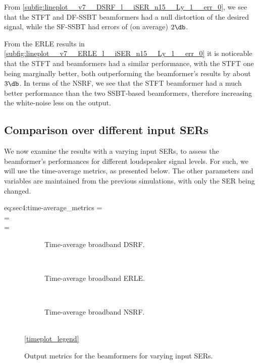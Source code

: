 From \cref{subfig:lineplot__v7__DSRF_l__iSER_n15__Ly_1__err_0}, we see that the STFT and DF-SSBT beamformers had a null distortion of the desired signal, while the SF-SSBT had errors of (on average) $2\dB$.

From the ERLE results in \cref{subfig:lineplot__v7__ERLE_l__iSER_n15__Ly_1__err_0} it is noticeable that the STFT and \nssbt{} beamformers had a similar performance, with the STFT one being marginally better, both outperforming the \nssbt{} beamformer's results by about $3\dB$. In terms of the NSRF, we see that the STFT beamformer had a much better performance than the two SSBT-based beamformers, therefore increasing the white-noise less on the output.

\subsection{Comparison over different input SERs}

We now examine the results with a varying input SERs, to assess the beamformer's performances for different loudspeaker signal levels. For such, we will use the time-average metrics, as presented below. The other parameters and variables are maintained from the previous simulations, with only the SER being changed.

\begin{subgather}{eq:sec4:time-average_metrics}
	\dsrf =  \\
	\erle =  \\
	\nsrf = 
\end{subgather}


\begin{figure}[!t]
	\centering
	\begin{subfigure}{\textwidth}
		\centering
		
		\caption{Time-average broadband DSRF.}
		\label{subfig:lineplot__v7__DSRF__iSER_var__Ly_1__err_0}
	\end{subfigure}\\[1em]
	\begin{subfigure}{\textwidth}
		\centering
		
		\caption{Time-average broadband ERLE.}
		\label{subfig:lineplot__v7__ERLE__iSER_var__Ly_1__err_0}
	\end{subfigure}\\[1em]
	\begin{subfigure}{\textwidth}
		\centering
		
		\caption{Time-average broadband NSRF.}
		\label{subfig:lineplot__v7__NSRF__iSER_var__Ly_1__err_0}
	\end{subfigure}\\[1em]
	\ref*{timeplot_legend}
	\caption{Output metrics for the beamformers for varying input SERs.}
	\label{fig:lineplot__v7__iSER_var__Ly_1__err_0}
\end{figure}

